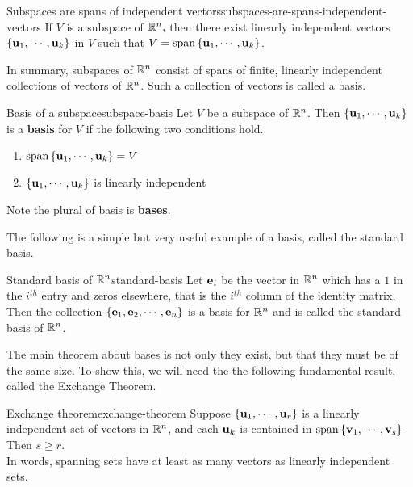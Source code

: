 \begin{corollary}{Subspaces are spans of independent vectors}{subspaces-are-spans-independent-vectors}
If $V$ is a subspace of $\mathbb{R}^{n},$ then there exist linearly independent 
vectors $\left\{\mbox{\bf u}_{1},\cdots ,\mbox{\bf u}_{k}\right\}$ in $V$ such
that $V=\mbox{\rm span}\left\{\mbox{\bf u}_{1},\cdots ,\mbox{\bf u}_{k}\right\} $.
\end{corollary}

In summary, subspaces of $\mathbb{R}^{n}$ consist of spans of finite,
linearly independent collections of vectors of $\mathbb{R}^{n}$.  Such
a collection of vectors is called a basis.

\begin{definition}{Basis of a subspace}{subspace-basis}
Let $V$ be a subspace of $\mathbb{R}^{n}$. Then $\left\{
\mbox{\bf u}_{1},\cdots ,\mbox{\bf u}_{k}\right\} $ is a \textbf{basis} for $V$ if the following two conditions hold.

\begin{enumerate}
\item $\mbox{\rm span}\left\{\mbox{\bf u}_{1},\cdots ,\mbox{\bf u}_{k}\right\} =V$
\item $\left\{\mbox{\bf u}_{1},\cdots ,\mbox{\bf u}_{k}\right\} $ is linearly
independent
\end{enumerate}

Note the plural of basis is \textbf{bases}. 
\end{definition}

The following is a simple but very useful example of a basis, called the standard basis.

\begin{definition}{Standard basis of $\mathbb{R}^n$}{standard-basis}
Let $\mbox{\bf e}_i$ be the vector in $\mathbb{R}^n$ which has a $1$ in the $i^{th}$ entry and zeros elsewhere, that is the $i^{th}$ column of the identity matrix. Then the collection $\left\{\mbox{\bf e}_1, \mbox{\bf e}_2, \cdots, \mbox{\bf e}_n
\right\}$ is a basis for
$\mathbb{R}^n$ and is called the standard basis of $\mathbb{R}^n$.
\end{definition}

The main theorem about bases is not only they exist, but that they
must be of the same size. To show this, we will need the the following
fundamental result, called the Exchange Theorem.

\begin{theorem}{Exchange theorem}{exchange-theorem}
Suppose $\left\{\mbox{\bf u}_{1},\cdots ,\mbox{\bf u}_{r}\right\} $ is a
linearly independent set of vectors in $\mathbb{R}^n$, and each
$\mbox{\bf u}_{k}$ is contained in $\mbox{\rm span}\left\{\mbox{\bf v}_{1},\cdots
,\mbox{\bf v}_{s}\right\}$ Then $s\geq r.$ \\
In words, spanning sets have at least as many vectors as linearly
independent sets.
\end{theorem}

